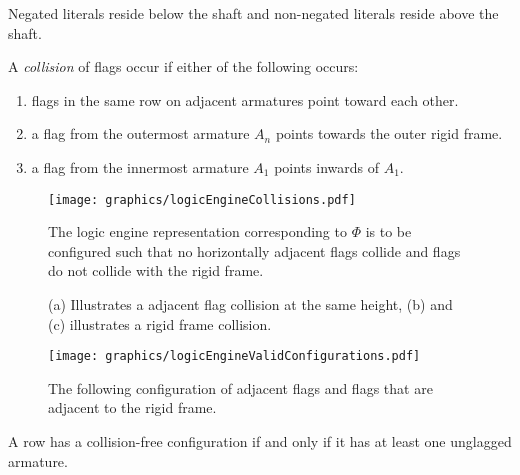 Negated literals reside below the shaft and non-negated literals reside above the shaft.

A \textit{collision} of flags occur if either of the following occurs:
\begin{enumerate}
\item flags in the same row on adjacent armatures point toward each other.
\item a flag from the outermost armature $A_n$ points towards the outer rigid frame.
\item a flag from the innermost armature $A_1$ points inwards of $A_1$.
\end{enumerate}
\begin{figure}[!htbp]
\begin{center}
\texttt{[image: graphics/logicEngineCollisions.pdf]}
\caption{(a) Illustrates a adjacent flag collision at the same height, (b) and (c) illustrates a 
rigid frame collision.}\label{fig:logicEngineCollisions.pdf}
\end{center}
The logic engine representation corresponding to $\Phi$ is to be configured such that no 
horizontally adjacent flags collide and flags do not collide with the rigid frame. 
\end{figure}
\begin{figure}[!htbp]
\begin{center}
\texttt{[image: graphics/logicEngineValidConfigurations.pdf]}
\caption{The following configuration of adjacent flags 
and flags that are adjacent to the rigid frame.}\label{fig:logicEngineValidConfigurations.pdf}
\end{center}
\end{figure}
\begin{lem}\label{lem:logicEngine1}A row has a collision-free configuration if and only if it has 
at least one unglagged armature. \end{lem}
